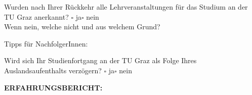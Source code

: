 \documentclass[12pt, a4paper]{article}
\newcommand{\heading}[1]{\bigskip\noindent\textbf{\MakeUppercase{#1}:}\medskip}
\newcommand{\blank}{\hrulefill}
\newcommand{\yesnoboxes}{\hspace{1ex}\(\square\) ja\hspace{5ex}\(\square\) nein}
\begin{document}
Wurden nach Ihrer Rückkehr alle Lehrveranstaltungen für das Studium an der TU Graz anerkannt?
\yesnoboxes \\
Wenn nein, welche nicht und aus welchem Grund? \blank

Tipps für NachfolgerInnen: \blank

Wird sich Ihr Studienfortgang an der TU Graz als Folge Ihres Auslandsaufenthalts verzögern?
\yesnoboxes


\heading{Erfahrungsbericht}

\end{document}
